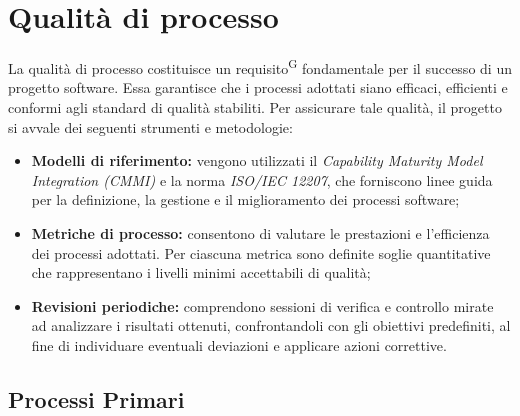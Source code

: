 \documentclass[a4paper, 11pt]{article}
\begin{document}
\newpage
\section{Qualità di processo}
La qualità di processo costituisce un requisito\textsuperscript{G} fondamentale per il successo di un progetto software.
Essa garantisce che i processi adottati siano efficaci, efficienti e conformi agli standard di qualità stabiliti.
Per assicurare tale qualità, il progetto si avvale dei seguenti strumenti e metodologie:

\begin{itemize}
    \item \textbf{Modelli di riferimento:} vengono utilizzati il \textit{Capability Maturity Model Integration (CMMI)} e la norma \textit{ISO/IEC 12207}, che forniscono linee guida per la definizione, la gestione e il miglioramento dei processi software;
    \item \textbf{Metriche di processo:} consentono di valutare le prestazioni e l’efficienza dei processi adottati. Per ciascuna metrica sono definite soglie quantitative che rappresentano i livelli minimi accettabili di qualità;
    \item \textbf{Revisioni periodiche:} comprendono sessioni di verifica e controllo mirate ad analizzare i risultati ottenuti, confrontandoli con gli obiettivi predefiniti, al fine di individuare eventuali deviazioni e applicare azioni correttive.
\end{itemize}

\subsection{Processi Primari}
\end{document}
